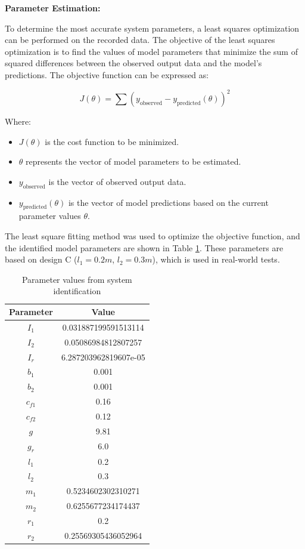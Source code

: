 \textbf{Parameter Estimation:}

To determine the most accurate system parameters, a least squares optimization can be performed on the recorded data. The objective of the least squares optimization is to find the values of model parameters that minimize the sum of squared differences between the observed output data and the model's predictions. The objective function can be expressed as:

\begin{equation}
J(\theta) = \sum (y_{\text{observed}} - y_{\text{predicted}}(\theta))^2
\end{equation}

Where:
\begin{itemize}
\item $J(\theta)$ is the cost function to be minimized.
\item $\theta$ represents the vector of model parameters to be estimated.
\item $y_{\text{observed}}$ is the vector of observed output data.
\item $y_{\text{predicted}}(\theta)$ is the vector of model predictions based on the current parameter values $\theta$.
\end{itemize}

The least square fitting method was used to optimize the objective function, and the identified model parameters are shown in Table \ref{tab:parameters}.  These parameters are based on design C ($l_1 = 0.2m$, $l_2 = 0.3m$), which is used in real-world tests.

\begin{table}[H]
\centering
\begin{tabular}{|c|c|}
\hline
\textbf{Parameter} & \textbf{Value} \\
\hline
$I_1$ & 0.031887199591513114 \\
$I_2$ & 0.05086984812807257 \\
$I_r$ & 6.287203962819607e-05 \\
$b_1$ & 0.001 \\
$b_2$ & 0.001 \\
$c_{f1}$ & 0.16 \\
$c_{f2}$ & 0.12 \\
$g$ & 9.81 \\
$g_r$ & 6.0 \\
$l_1$ & 0.2 \\
$l_2$ & 0.3 \\
$m_1$ & 0.5234602302310271 \\
$m_2$ & 0.6255677234174437 \\
$r_1$ & 0.2 \\
$r_2$ & 0.25569305436052964 \\
\hline
\end{tabular}
\caption{Parameter values from system identification}
\label{tab:parameters}
\end{table}


